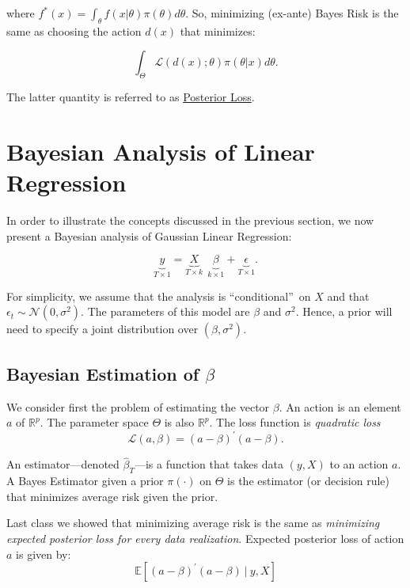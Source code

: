 \documentclass[12] {article}
\begin{document}
\noindent where $f^*(x)= \int_{\theta} f(x|\theta) \pi(\theta) d \theta$. So, minimizing (ex-ante) Bayes Risk is the same as choosing the action $d(x)$ that minimizes: 

\[ \int_{\Theta} \mathcal{L}(d(x); \theta)\pi (\theta | x) d \theta.  \] 

\noindent The latter quantity is referred to as \underline{Posterior Loss}. 

\newpage

\section{Bayesian Analysis of Linear Regression}

In order to illustrate the concepts discussed in the previous section, we now present a Bayesian analysis of Gaussian Linear Regression:

\begin{equation}
\underbrace{y}_{T \times 1} = \underbrace{X}_{T \times k} \: \: \underbrace{\beta}_{k \times 1} + \underbrace{\epsilon}_{T \times 1}.
\end{equation}

\noindent For simplicity, we assume that the analysis is ``conditional\textquotedblright\, on $X$ and that $\epsilon_{t} \sim \mathcal{N}(0,\sigma^2)$. The parameters of this model are $\beta$ and $\sigma^2$. Hence, a prior will need to specify a joint distribution over $(\beta, \sigma^2)$.  

\subsection{Bayesian Estimation of $\beta$}

We consider first the problem of estimating the vector $\beta$. An action is an element $a$ of $\mathbb{R}^p$. The parameter space $\Theta$ is also $\mathbb{R}^p$. The loss function is \emph{quadratic loss}
\begin{equation}
\mathcal{L}(a, \beta) = (a-\beta)^{\prime}(a-\beta). 
\end{equation}

\noindent An estimator---denoted $\widehat{\beta}_{T}$---is a function that takes data $(y,X)$ to an action $a$. A Bayes Estimator given a prior $\pi(\cdot)$ on $\Theta$ is the estimator (or decision rule) that minimizes average risk given the prior.  

Last class we showed that minimizing average risk is the same as \emph{minimizing expected posterior loss for every data realization}. Expected posterior loss of action $a$ is given by:
\[ \mathbb{E} [ (a-\beta)^{\prime} (a-\beta) \: | \: y,X ]\]
\end{document}
